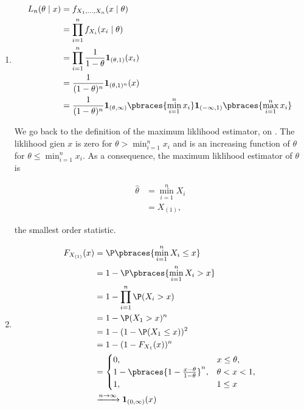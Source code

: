\begin{solution}

\phantom{}

\begin{enumerate}[label = (\alph*)]

    \item

    \begin{align*}
        L_n(\theta \mid x)
        & =
        f_{X_1, \dots, X_n}(x \mid \theta) \\
        & =
        \prod_{i=1}^n
            f_{X_i}(x_i \mid \theta) \\
        & =
        \prod_{i=1}^n
            \frac{1}{1 - \theta} \mathbf 1_{(\theta, 1)}(x_i) \\
        & =
        \frac{1}{(1 - \theta)^n} \mathbf 1_{(\theta, 1)^n}(x) \\
        & =
        \frac{1}{(1 - \theta)^n}
        \mathbf 1_{(\theta, \infty)}
        \pbraces
        {
            \min_{i=1}^n x_i
        }
        \mathbf 1_{(-\infty, 1)}
        \pbraces
        {
            \max_{i=1}^n x_i
        }
    \end{align*}

    We go back to the definition of the maximum liklihood estimator, on \cite*[lecture 6, slide 47]{EStat}.
    The liklihood gien $x$ is zero for $\theta > \min_{i=1}^n x_i$ and is an increasing function of $\theta$ for $\theta \leq \min_{i=1}^n x_i$.
    As a consequence, the maximum liklihood estimator of $\theta$ is

    \begin{align*}
        \hat \theta
        & =
        \min_{i=1}^n X_i \\
        & =
        X_{(1)},
    \end{align*}

    the smallest order statistic.

    \item

    \begin{align*}
        F_{X_{(1)}}(x)
        & =
        \P \pbraces{\min_{i=1}^n X_i \leq x} \\
        & =
        1 - \P \pbraces{\min_{i=1}^n X_i > x} \\
        & =
        1 - \prod_{i=1}^n \P(X_i > x) \\
        & =
        1 - \P(X_1 > x)^n \\
        & =
        1 - (1 - \P(X_1 \leq x))^2 \\
        & =
        1 - (1 - F_{X_1}(x))^n \\
        & =
        \begin{cases}
            0,
            & x \leq \theta, \\
            1 - \pbraces{1 - \frac{x - \theta}{1 - \theta}}^n,
            & \theta < x < 1, \\
            1,
            & 1 \leq x
        \end{cases} \\
        & \xrightarrow{n \to \infty}
        \mathbf 1_{(0, \infty)}(x)
    \end{align*}


\end{enumerate}
\end{solution}

